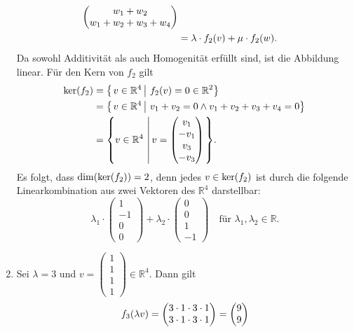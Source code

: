 \documentclass[german,12pt]{homework}
\newcommand{\RR}{\mathbb{R}}
\DeclarePairedDelimiter{\enbrace}{(}{)}
\DeclarePairedDelimiter{\penbrace}{\{}{\}}
\begin{document}
\begin{enumerate}
\begin{align*}
\begin{pmatrix}
                w_1 + w_2\\
                w_1 + w_2 + w_3 + w_4
            \end{pmatrix}\\
            &= \lambda \cdot f_2\enbrace*{v} + \mu \cdot f_2\enbrace*{w}.
        \end{align*}
        Da sowohl Additivität als auch Homogenität erfüllt sind, ist die
        Abbildung linear. Für den Kern von \(f_2\) gilt
        \begin{align*}
            \ker\enbrace*{f_2} &= \penbrace*{\left.v \in \RR^4\,\right|\,
            f_2\enbrace*{v} = 0 \in \RR^2}\\
            &= \penbrace*{\left.v \in \RR^4\,\right|\,v_1 + v_2 = 0 \land
            v_1 + v_2 + v_3 + v_4 = 0}\\
            &= \penbrace*{v \in \RR^4\,\left|\,v = \begin{pmatrix}v_1\\-v_1\\
            v_3\\-v_3\end{pmatrix}\right.}.
        \end{align*}
        Es folgt, dass \(\dim\enbrace*{\ker\enbrace*{f_2}} = 2\), denn jedes
        \(v \in \ker\enbrace*{f_2}\) ist durch die folgende Linearkombination
        aus zwei Vektoren des \(\RR^4\) darstellbar:
        \[\lambda_1 \cdot \begin{pmatrix}1\\-1\\0\\0\end{pmatrix} + \lambda_2
        \cdot \begin{pmatrix}0\\0\\1\\-1\end{pmatrix} \quad \text{für }
        \lambda_1, \lambda_2 \in \RR.\]
        \item Sei \(\lambda = 3\) und \(v = \begin{pmatrix}1\\1\\1\\1
        \end{pmatrix} \in \RR^4\). Dann gilt
        \[f_3\enbrace*{\lambda{v}} = \begin{pmatrix}3 \cdot 1 \cdot 3 \cdot 1\\
        3 \cdot 1 \cdot 3 \cdot 1 \end{pmatrix} = \begin{pmatrix}9\\9

\end{pmatrix}\]
\end{enumerate}
\end{document}
